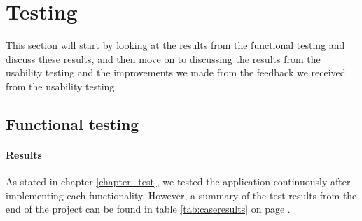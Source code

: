 

\section{Testing}\label{con_testing}
This section will start by looking at the results from the functional testing and discuss these results, and then move on to discussing the results from the usability testing and the improvements we made from the feedback we received from the usability testing.

\subsection{Functional testing}

\paragraph{Results}\hfill
\newline
As stated in chapter \ref{chapter_test}, we tested the application continuously after implementing each functionality. However, a summary of the test results from the end of the project can be found in table \ref{tab:caseresults} on page \pageref{tab:caseresults}.
